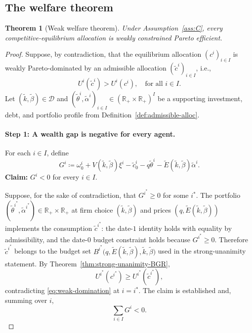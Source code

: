 \documentclass[11pt,a4paper,oneside]{book}
\def\R{\mathbb{R}}
\def\geq{\geqslant}
\theoremstyle{plain}
\newtheorem{theorem}{Theorem}[chapter]
\theoremstyle{definition}
\theoremstyle{remark}
\numberwithin{equation}{chapter}
\begin{document}
\subsection{The welfare theorem}

\begin{theorem}[Weak welfare theorem]\label{thm:welfare-BGR}
Under Assumption~\ref{ass:C}, every competitive-equilibrium allocation is weakly constrained Pareto efficient.
\end{theorem}

\begin{proof}
Suppose, by contradiction, that the equilibrium allocation $(c^i)_{i \in I}$ is weakly Pareto-dominated by an admissible allocation $(\widetilde{c}^i)_{i \in I}$, i.e.,
\begin{equation}\label{eq:weak-domination}
  U^i(\widetilde{c}^i) > U^i(c^i), \quad \text{for all $i \in I$.}
\end{equation}
Let $(\widetilde{k}, \widetilde{\beta}) \in \mathcal{D}$ and $(\widetilde{\theta}^i, \widetilde{\alpha}^i)_{i \in I} \in (\R_+ \times \R_+)^I$ be a supporting investment, debt, and portfolio profile from Definition~\ref{def:admissible-alloc}.

\paragraph{Step 1: A wealth gap is negative for every agent.}
For each $i \in I$, define
\begin{equation}\label{eq:wealth-gap}
  G^i \coloneqq \omega^i_0 + V(\widetilde{k}, \widetilde{\beta}) \xi^i - \widetilde{c}^i_0 - q \widetilde{\theta}^i - \widetilde{E}(\widetilde{k}, \widetilde{\beta}) \widetilde{\alpha}^i.
\end{equation}
\textbf{Claim:} $G^i < 0$ for every $i \in I$.

Suppose, for the sake of contradiction, that $G^{i^\ast} \geq 0$ for some $i^\ast$.
The portfolio $(\widetilde{\theta}^{i^\ast}, \widetilde{\alpha}^{i^\ast}) \in \R_+ \times \R_+$ at firm choice $(\widetilde{k}, \widetilde{\beta})$ and prices $(q, \widetilde{E}(\widetilde{k}, \widetilde{\beta}))$ implements the consumption $\widetilde{c}^{i^\ast}$:
the date-$1$ identity holds with equality by admissibility, and the date-$0$ budget constraint holds because $G^{i^\ast} \geq 0$.
Therefore $\widetilde{c}^{i^\ast}$ belongs to the budget set $B^{i^\ast}\bigl(q, \widetilde{E}(\widetilde{k}, \widetilde{\beta}), \widetilde{k}, \widetilde{\beta}\bigr)$ used in the strong-unanimity statement.
By Theorem~\ref{thm:strong-unanimity-BGR},
\begin{equation*}
  U^{i^\ast}(c^{i^\ast}) \geq U^{i^\ast}(\widetilde{c}^{i^\ast}),
\end{equation*}
contradicting \eqref{eq:weak-domination} at $i = i^\ast$.
The claim is established and, summing over $i$,
\begin{equation}\label{eq:sum-G-neg}
  \sum_{i \in I} G^i < 0.
\end{equation}


\end{proof}
\end{document}
